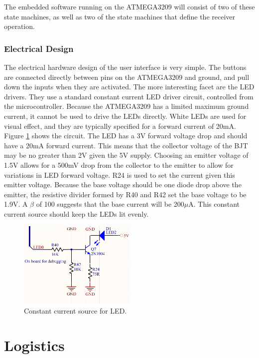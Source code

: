 \documentclass{article}
\begin{document}
	The embedded software running on the ATMEGA3209 will consist of two of these state machines, as well as two of the state machines that define the receiver operation.

	\subsubsection{Electrical Design}
	The electrical hardware design of the user interface is very simple.  The buttons are connected directly between pins on the ATMEGA3209 and ground, and pull down the inputs when they are activated.  The more interesting facet are the LED drivers.  They use a standard constant current LED driver circuit, controlled from the microcontroller.  Because the ATMEGA3209 has a limited maximum ground current, it cannot be used to drive the LEDs directly.  White LEDs are used for visual effect, and they are typically specified for a forward current of 20mA.  Figure \ref{fig:LEDdriver} shows the circuit.  The LED has a 3V forward voltage drop and should have a 20mA forward current.  This means that the collector voltage of the BJT may be no greater than 2V given the 5V supply.  Choosing an emitter voltage of 1.5V allows for a 500mV drop from the collector to the emitter to allow for variations in LED forward voltage.  R24 is used to set the current given this emitter voltage.  Because the base voltage should be one diode drop above the emitter, the resistive divider formed by R40 and R42 set the base voltage to be 1.9V.  A $\beta$ of 100 suggests that the base current will be 200$\mu$A.  This constant current source should keep the LEDs lit evenly.

	\begin{figure}
		\centering
		\includegraphics[width = 0.5\textwidth]{PR4Images/LEDconstcurrentdriver.PNG}
		\caption{Constant current source for LED.}
		\label{fig:LEDdriver}
	\end{figure}


\section{Logistics}
\end{document}
